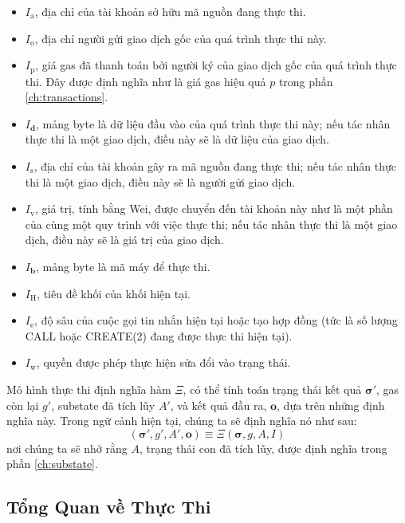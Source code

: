 \documentclass[9pt,oneside]{amsart}
\begin{document}
\begin{multicols}{2}
\begin{itemize}
\item \(I_{\mathrm{a}}\), địa chỉ của tài khoản sở hữu mã nguồn đang thực thi.
\item \(I_{\mathrm{o}}\), địa chỉ người gửi giao dịch gốc của quá trình thực thi này.
\item \(I_{\mathrm{p}}\), giá gas đã thanh toán bởi người ký của giao dịch gốc của quá trình thực thi. Đây được định nghĩa như là giá gas hiệu quả \hyperlink{effective_gas_price_p}{$p$} trong phần \ref{ch:transactions}.
\item \(I_{\mathbf{d}}\), mảng byte là dữ liệu đầu vào của quá trình thực thi này; nếu tác nhân thực thi là một giao dịch, điều này sẽ là dữ liệu của giao dịch.
\item \(I_{\mathrm{s}}\), địa chỉ của tài khoản gây ra mã nguồn đang thực thi; nếu tác nhân thực thi là một giao dịch, điều này sẽ là người gửi giao dịch.
\item \(I_{\mathrm{v}}\), giá trị, tính bằng Wei, được chuyển đến tài khoản này như là một phần của cùng một quy trình với việc thực thi; nếu tác nhân thực thi là một giao dịch, điều này sẽ là giá trị của giao dịch.
\item \(I_{\mathbf{b}}\), mảng byte là mã máy để thực thi.
\item \(I_{\mathrm{H}}\), tiêu đề khối của khối hiện tại.
\item \(I_{\mathrm{e}}\), độ sâu của cuộc gọi tin nhắn hiện tại hoặc tạo hợp đồng (tức là số lượng {\small CALL} hoặc {\small CREATE(2)} đang được thực thi hiện tại).
\item \(I_{\mathrm{w}}\), quyền được phép thực hiện sửa đổi vào trạng thái.
\end{itemize}

Mô hình thực thi định nghĩa hàm \(\Xi\), có thể tính toán trạng thái kết quả \(\boldsymbol{\sigma}'\), gas còn lại \(g'\), substate đã tích lũy \(A'\), và kết quả đầu ra, \(\mathbf{o}\), dựa trên những định nghĩa này.
Trong ngữ cảnh hiện tại, chúng ta sẽ định nghĩa nó như sau:
\begin{equation}
(\boldsymbol{\sigma}', g', A', \mathbf{o}) \equiv \Xi(\boldsymbol{\sigma}, g, A, I)
\end{equation}
nơi chúng ta sẽ nhớ rằng \(A\), trạng thái con đã tích lũy, được định nghĩa trong phần \ref{ch:substate}.

\subsection{Tổng Quan về Thực Thi}\label{xi_def}


\end{multicols}
\end{document}

